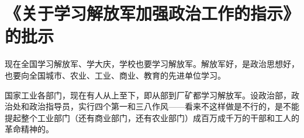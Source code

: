 \section[《关于学习解放军加强政治工作的指示》的批示（一九六四年）]{《关于学习解放军加强政治工作的指示》的批示}


现在全国学习解放军、学大庆，学校也要学习解放军。解放军好，是政治思想好，也要向全国城市、农业、工业、商业、教育的先进单位学习。

国家工业各部门，现在有人从上至下，即从部到厂矿都学习解放军。设政治部，政治处和政治指导员，实行四个第一和三八作风——看来不这样做是不行的，是不能提起整个工业部门（还有商业部门，还有农业部门）成百万成千万的干部和工人的革命精神的。



